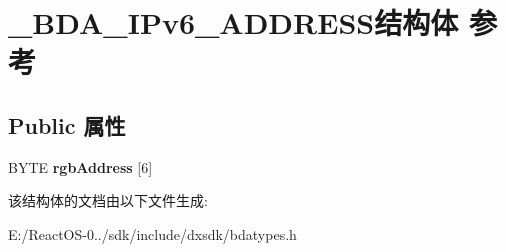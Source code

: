 \hypertarget{struct___b_d_a___i_pv6___a_d_d_r_e_s_s}{}\section{\+\_\+\+B\+D\+A\+\_\+\+I\+Pv6\+\_\+\+A\+D\+D\+R\+E\+S\+S结构体 参考}
\label{struct___b_d_a___i_pv6___a_d_d_r_e_s_s}
\subsection*{Public 属性}
\begin{DoxyCompactItemize}
\item 
\mbox{\label{struct___b_d_a___i_pv6___a_d_d_r_e_s_s_a3a645ebdf534dbaa1de6a2fa95fbb93b}} 
B\+Y\+TE {\bfseries rgb\+Address} \mbox{[}6\mbox{]}
\end{DoxyCompactItemize}


该结构体的文档由以下文件生成\+:\begin{DoxyCompactItemize}
\item 
E\+:/\+React\+O\+S-\/0../sdk/include/dxsdk/bdatypes.\+h\end{DoxyCompactItemize}
